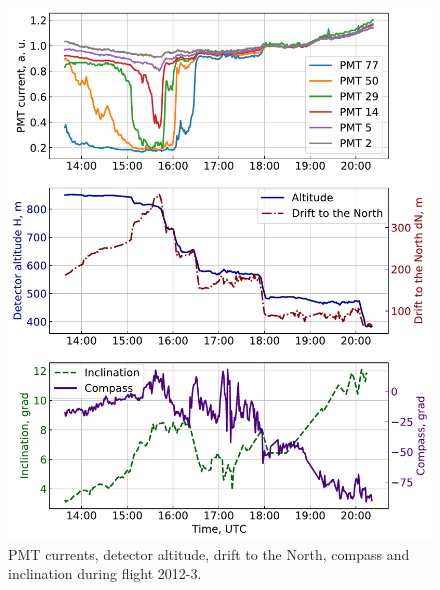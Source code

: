 \documentclass[universe,article,submit,moreauthors,pdftex]{Definitions/mdpi}
\begin{document}
\begin{paracol}{2}
\begin{figure}[tb]
    \begin{minipage}[t]{0.48\textwidth}
        \centering
        \includegraphics[width=\textwidth]{2012-3_currents_H_dN.pdf}
        \caption{PMT currents, detector altitude, drift to the North, compass and inclination during flight 2012-3.}
        \label{fig:2012-3_currents}
    \end{minipage}
    \hfill
    \begin{minipage}[t]{0.48\textwidth}
        \centering

\end{minipage}
\end{figure}
\end{paracol}
\end{document}
